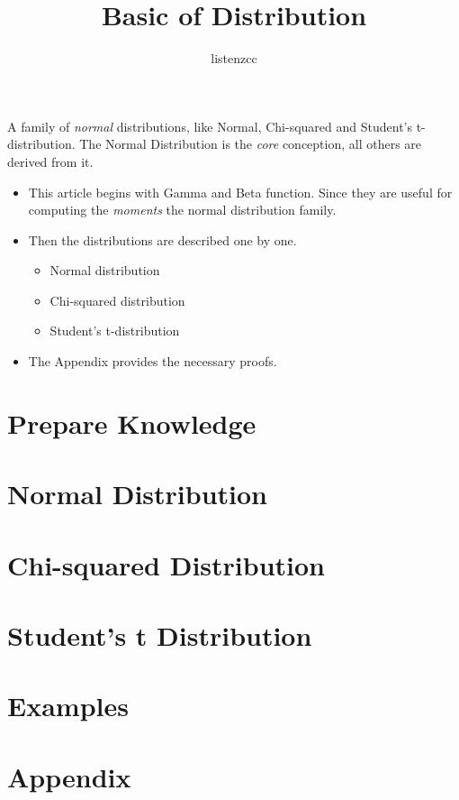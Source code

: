 \documentclass[a4paper]{article}
\title{Basic of Distribution}
\author{listenzcc}
\begin{document}
\maketitle

\abstract
A family of \emph{normal} distributions, like Normal, Chi-squared and Student's t-distribution.
The Normal Distribution is the \emph{core} conception, all others are derived from it.

\begin{itemize}
    \item This article begins with Gamma and Beta function.
          Since they are useful for computing the \emph{moments} the normal distribution family.
    \item Then the distributions are described one by one.
          \begin{itemize}
              \item Normal distribution
              \item Chi-squared distribution
              \item Student's t-distribution
          \end{itemize}
    \item The Appendix provides the necessary proofs.
\end{itemize}

\newpage

\tableofcontents
\newpage

\section{Prepare Knowledge}

\newpage

\section{Normal Distribution}

\newpage

\section{Chi-squared Distribution}

\newpage

\section{Student's t Distribution}

\newpage

\section{Examples}

\newpage

\appendix

\section{Appendix}

\end{document}
